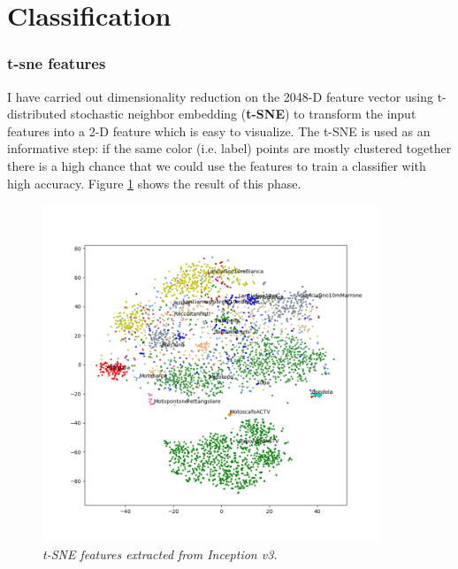 \documentclass[12pt]{article}
\begin{document}
\section{Classification}
\subsubsection{t-sne features}
I have carried out dimensionality reduction on the 2048-D feature vector using t-distributed stochastic neighbor embedding (\textbf{t-SNE}) to transform the input features into a 2-D feature which is easy to visualize. The t-SNE is used as an informative step: if the same color (i.e. label) points are mostly clustered together there is a high chance that we could use the features to train a classifier with high accuracy. Figure \ref{fig:tsne} shows the result of this phase.

\begin{figure}[!hb]
	\centering 
	\includegraphics[width=0.9\textwidth]{../code/output/features.png} 
	\caption{\textit{t-SNE features extracted from Inception v3.}}
	\label{fig:tsne}
\end{figure}
\end{document}
